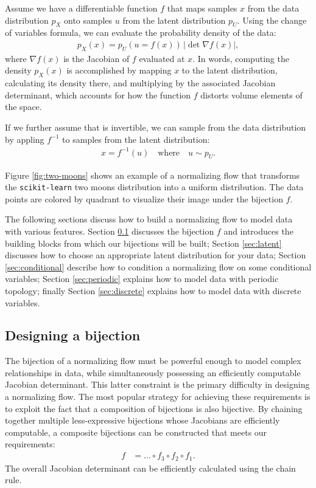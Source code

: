 \documentclass[twocolumn]{aastex631}
\newcommand{\px}{p^{}_{X}}
\newcommand{\pu}{p^{}_{U}}
\begin{document}
Assume we have a differentiable function $f$ that maps samples $x$ from the data distribution $\px$ onto samples $u$ from the latent distribution $\pu$.
Using the change of variables formula, we can evaluate the probability density of the data:
\begin{align}
    \px(x) = \pu(u=f(x)) \, |\det \nabla f(x)|,
    \label{eq:px}
\end{align}
where $\nabla f(x)$ is the Jacobian of $f$ evaluated at $x$.
In words, computing the density $\px(x)$ is accomplished by mapping $x$ to the latent distribution, calculating its density there, and multiplying by the associated Jacobian determinant, which accounts for how the function $f$ distorts volume elements of the space.

If we further assume that is invertible, we can sample from the data distribution by appling $f^{-1}$ to samples from the latent distribution:
\begin{align}
    x = f^{-1}(u) \quad \text{where} \quad u \sim \pu.
\end{align}

Figure \ref{fig:two-moons} shows an example of a normalizing flow that transforms the \texttt{scikit-learn} two moons distribution into a uniform distribution.
The data points are colored by quadrant to visualize their image under the bijection $f$.

The following sections discuss how to build a normalizing flow to model data with various features.
Section \ref{sec:bijections} discusses the bijection $f$ and introduces the building blocks from which our bijections will be built;
Section \ref{sec:latent} discusses how to choose an appropriate latent distribution for your data;
Section \ref{sec:conditional} describe how to condition a normalizing flow on some conditional variables;
Section \ref{sec:periodic} explains how to model data with periodic topology;
finally Section \ref{sec:discrete} explains how to model data with discrete variables.


\subsection{Designing a bijection}
\label{sec:bijections}

The bijection of a normalizing flow must be powerful enough to model complex relationships in data, while simultaneously possessing an efficiently computable Jacobian determinant.
This latter constraint is the primary difficulty in designing a normalizing flow.
The most popular strategy for achieving these requirements is to exploit the fact that a composition of bijections is also bijective.
By chaining together multiple less-expressive bijections whose Jacobians are efficiently computable, a composite bijections can be constructed that meets our requirements:
\begin{align}
    f &= \dots \circ f_3 \circ f_2 \circ f_1.
\end{align}
The overall Jacobian determinant can be efficiently calculated using the chain rule.
\end{document}
